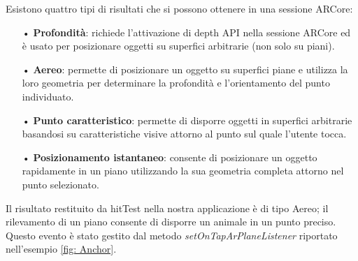 \documentclass[crop=false, class=book]{standalone}
\begin{document}
		\clearpage
		Esistono quattro tipi di risultati che si possono ottenere in una sessione ARCore:
		\begin{itemize}
		\item[•] \textbf{Profondità}: richiede l'attivazione di depth API nella sessione ARCore ed è usato per posizionare oggetti su superfici arbitrarie (non solo su piani).
		\item[•]\textbf{Aereo}: permette di posizionare un oggetto su superfici piane e utilizza la loro geometria per determinare la profondità e l'orientamento del punto individuato.
		\item[•] \textbf{Punto caratteristico}: permette di disporre oggetti in superfici arbitrarie basandosi su caratteristiche visive attorno al punto sul quale l'utente tocca. 
		\item[•] \textbf{Posizionamento istantaneo}: consente di posizionare un oggetto rapidamente in un piano utilizzando la sua geometria completa attorno nel punto selezionato. 
	\end{itemize}
	
	\begin{flushleft}
		Il risultato restituito da hitTest nella nostra applicazione è di tipo Aereo; il rilevamento di un piano consente di 			disporre un animale in un punto preciso. Questo evento è stato gestito dal metodo 									\textit{setOnTapArPlaneListener} riportato nell'esempio \vref{fig: Anchor}.\\
	\end{flushleft}
		
	
\end{document}
